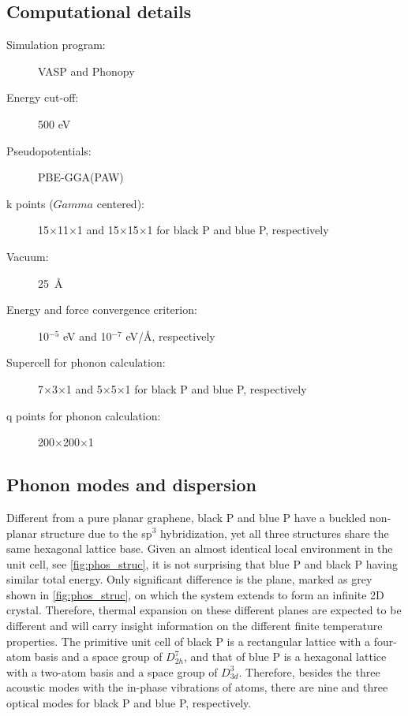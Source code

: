\subsection{Computational details}

\begin{footnotesize}
\begin{description}
\item[Simulation program:] VASP and Phonopy\cite{phonopy_code}
\item[Energy cut-off:] 500 eV
\item[Pseudopotentials:] PBE-GGA(PAW)
\item[k points ($Gamma$ centered):] 15$\times$11$\times$1 and 15$\times$15$\times$1 for black P and blue P, respectively 
\item[Vacuum:] 25~\AA
\item[Energy and force convergence criterion:] 10$^{-5}$ eV and 10$^{-7}$ eV/\AA, respectively
\item[Supercell for phonon calculation:] 7$\times$3$\times$1 and 5$\times$5$\times$1 for black P and blue P, respectively
\item[q points for phonon calculation:] 200$\times$200$\times$1
\end{description}
\end{footnotesize}

\subsection{Phonon modes and dispersion \label{sec:pho_phos}}

Different from a pure planar graphene, black P and blue P have a buckled non-planar structure due to the sp$^3$ hybridization, yet all three structures share the same hexagonal lattice base. Given an almost identical local environment in the unit cell, see \autoref{fig:phos_struc}, it is not surprising that blue P and black P having similar total energy. Only significant difference is the plane, marked as grey shown in \autoref{fig:phos_struc}, on which the system extends to form an infinite 2D crystal. Therefore, thermal expansion on these different planes are expected to be different and will carry insight information on the different finite temperature properties. The primitive unit cell of black P is a rectangular lattice with a four-atom basis and a space group of $D_{2h}^7$, and that of blue P is a hexagonal lattice with a two-atom basis and a space group of  $D_{3d}^3$. Therefore, besides the three acoustic modes with the in-phase vibrations of atoms, there are nine and three optical modes for black P and blue P, respectively. 

